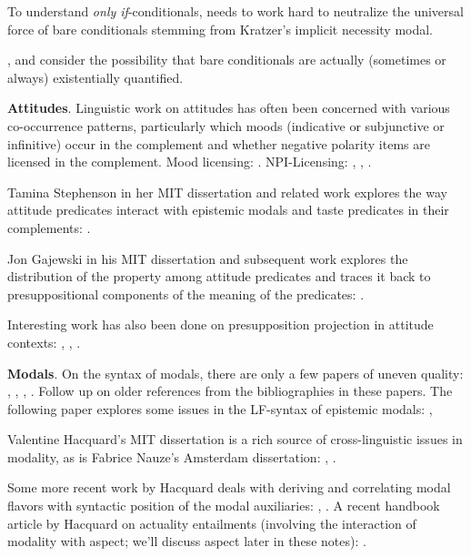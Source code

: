 To understand \emph{only if}-conditionals, \cite{fintel-1997-bare} needs to work
hard to neutralize the universal force of bare conditionals stemming from
Kratzer's implicit necessity modal.

\cite{herburger-2015-only-if,herburger-2016-perfection}, and
\cite{bassi-bar-lev-2017-unified-existential} consider the possibility that
bare conditionals are actually (sometimes or always) existentially quantified.

\textbf{Attitudes}. Linguistic work on attitudes has often been concerned with
various co-occurrence patterns, particularly which moods (indicative or
subjunctive or infinitive) occur in the complement and whether negative polarity
items are licensed in the complement. Mood licensing: \cite{portner-1997-mood}.
NPI-Licensing: \cite{kadmon-landman-1993-any}, \cite{fintel-1999-npi},
\cite{giannakidou-1999-affective}.

Tamina Stephenson in her MIT dissertation and related work explores the way
attitude predicates interact with epistemic modals and taste predicates in their
complements: \cite{stephenson-2007-judge-lp,stephenson-2007-thesis}.

Jon Gajewski in his MIT dissertation and subsequent work explores the
distribution of the  property among attitude predicates and
traces it back to presuppositional components of the meaning of the predicates:
\cite{gajewski-2005-thesis,gajewski-2007-neg-raising}.

Interesting work has also been done on presupposition projection in attitude
contexts: \cite{asher-1987-attitudes}, \cite{heim-1992-attitude},
\cite{geurts-1998-attitudes}.

\textbf{Modals}. On the syntax of modals, there are only a few papers of uneven
quality: \cite{bhatt-1997-haveto}, \cite{wurmbrand-1999-raising},
\cite{cormack-smith-2002-modals}, \cite{butler-2003-modality}. Follow up on
older references from the bibliographies in these papers. The following paper
explores some issues in the LF-syntax of epistemic modals:
\cite{fintel-iatridou-2003-ec},

Valentine Hacquard's MIT dissertation is a rich source of
cross-linguistic issues in modality, as is Fabrice Nauze's Amsterdam
dissertation: \cite{hacquard-2006-dissertation},  \cite{nauze-2008-thesis}.

Some more recent work by Hacquard deals with deriving and correlating modal
flavors with syntactic position of the modal auxiliaries:
\cite{hacquard-2010-event-relativity}, \cite{hacquard-2013-modality}. A recent
handbook article by Hacquard on actuality entailments (involving the interaction
of modality with aspect; we'll discuss aspect later in these notes):
\cite{hacquard-2016-actuality}.


